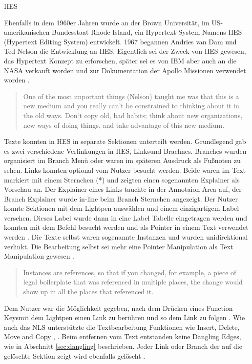 \begin{section}{HES}
\label{sec:hes}

Ebenfalls in dem 1960er Jahren wurde an der Brown Universität, im US-amerikanischen Bundesstaat Rhode Island, ein Hypertext-System Namens \glqq HES\grqq{ } (Hypertext Editing System) entwickelt. 1967 begannen Andries van Dam und Ted Nelson die Entwicklung an HES. Eigentlich sei der Zweck von HES gewesen, das Hypertext Konzept zu erforschen, später sei es von IBM aber auch an die NASA verkauft worden und zur Dokumentation der Apollo Missionen verwendet worden \cite{Dam1988}.

\begin{quote}
\glqq One of the most important things (Nelson) taught me was that this is a new medium and you really can’t be constrained to thinking about it in the old ways. Don‘t copy old, bad habits; think about new organizations, new ways of doing things, and take advantage of this new medium.\grqq{ }\cite{Dam1988}
\end{quote}

Texte konnten in HES in separate Sektionen unterteilt werden. Grundlegend gab es zwei verschiedene Verlinkungen in HES, \glqq Links\grqq{ }und \glqq Brachnes\grqq{ }. Branches wurden organisiert im Branch Menü oder waren im späteren Ausdruck als Fußnoten zu sehen. Links konnten optional vom Nutzer besucht werden. Beide waren im Text markiert mit einem Sternchen (*) und zeigten einen sogenannten Explainer als Vorschau an. Der Explainer eines Links tauchte in der Annotaion Area auf, der Branch Explainer wurde in-line beim Branch Sternchen angezeigt. Der Nutzer konnte Sektionen mit dem Lightpen auswählen und einem einzigartigem Label versehen. Dieses Label wurde dann in eine Label Tabelle eingetragen werden und konnten mit dem Befehl besucht werden und als Pointer in einem Text verwendet werden \cite{Dam1969}. Die Texte selbst waren sogenannte Instanzen und wurden unidirektional verlinkt. Die Bearbeitung selbst sei mehr eine Pointer Manipulation als Text Manipulation gewesen \cite[S. 890]{Dam1988}.

\begin{quote}
\glqq Instances are references, so that if you changed, for example, a piece of legal boilerplate that was referenced in multiple places, the change would show up in all the places that referenced it. \grqq{ }\cite{Dam1988}
\end{quote}

Dem Nutzer war die Möglichkeit gegeben, nach dem Drücken eines \glqq Function Keys\grqq{ }mit dem Lightpen einen Link zu berühren und so dem Link zu folgen \cite[S.23]{Dam1969}. Wie auch das NLS unterstützte die Textbearbeitung Funktionen wie Insert, Delete, Move and Copy \cite[S.10-14]{Dam1969}, \cite[S. 889]{Dam1988}. Beim entfernen vom Text entstanden keine Dangling Edges, wie in Abschnitt \ref{sec:dangling} beschrieben. Jeder Link oder Branch der auf die gelöschte Sektion zeigt wird ebenfalls gelöscht \cite[S.12]{Dam1969}.


\end{section}
